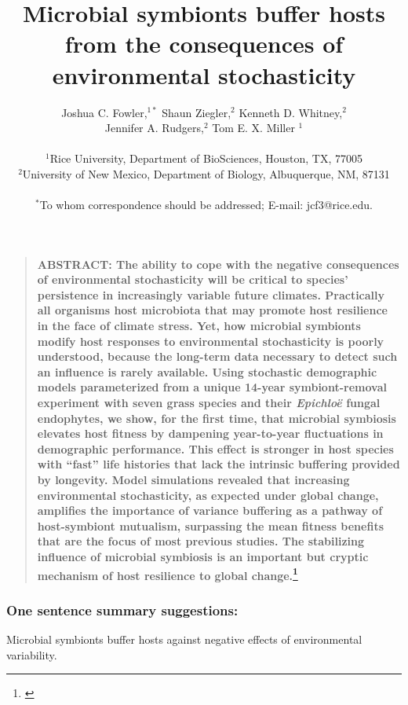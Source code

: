 \documentclass[12pt]{article}
\title{Microbial symbionts buffer hosts from the consequences of environmental stochasticity}
\author
{Joshua C. Fowler,$^{1\ast}$ Shaun Ziegler,$^{2}$ Kenneth D. Whitney,$^{2}$\\
	 Jennifer A. Rudgers,$^{2}$ Tom E. X. Miller $^{1}$\\
\\
\normalsize{$^{1}$Rice University, Department of BioSciences, Houston, TX, 77005}\\
\normalsize{$^{2}$University of New Mexico, Department of Biology, Albuquerque, NM, 87131}\\
\\
\normalsize{$^\ast$To whom correspondence should be addressed; E-mail:  jcf3@rice.edu.}
}
\date{}
\newcommand{\tom}[2]{{\color{red}{#1}}\footnote{\textit{\color{red}{#2}}}}
\newenvironment{sciabstract}{%
\begin{quote} \bf}
{\end{quote}}
\begin{document}
 


\baselineskip24pt


\maketitle 



\begin{sciabstract}
	ABSTRACT: 
    The ability to cope with the negative consequences of environmental stochasticity will be critical to species' persistence in increasingly variable future climates. 
	Practically all organisms host microbiota that may promote host resilience in the face of climate stress. 
	Yet, how microbial symbionts modify host responses to environmental stochasticity is poorly understood, because the long-term data necessary to detect such an influence is rarely available. 
	Using stochastic demographic models parameterized from a unique 14-year symbiont-removal experiment with seven grass species and their \emph{Epichlo\"{e}} fungal endophytes, we show, for the first time, that microbial symbiosis elevates host fitness by dampening year-to-year fluctuations in demographic performance. 
	This effect is stronger in host species with ``fast'' life histories that lack the intrinsic buffering provided by longevity. 
	Model simulations revealed that increasing environmental stochasticity, as expected under global change, amplifies the importance of variance buffering as a pathway of host-symbiont mutualism, surpassing the mean fitness benefits that are the focus of most previous studies. 
	The stabilizing influence of microbial symbiosis is an important but cryptic mechanism of host resilience to global change.\tom{}{The abstract is limited to 125 words. This is over the limit.} 

\end{sciabstract}


\subsubsection*{One sentence summary suggestions:}
Microbial symbionts buffer hosts against negative effects of environmental variability.
\end{document}
